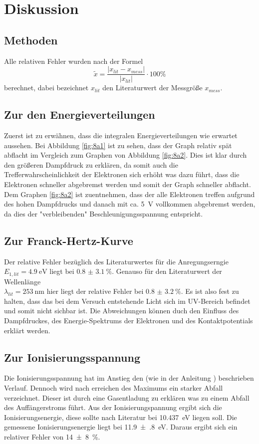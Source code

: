 \section{Diskussion}
\label{sec:Diskussion}
\subsection{Methoden}
Alle relativen Fehler wurden nach der Formel
\begin{equation*}
  \tilde{x} = \frac{ \lvert x_{lit} - x_{mess} \rvert}{\lvert x_{lit} \rvert}
  \cdot 100 \%
\end{equation*}
berechnet, dabei bezeichnet $x_{lit}$ den Literaturwert der Messgröße $x_{mess}$.
\subsection{Zur den Energieverteilungen}
Zuerst ist zu erwähnen, dass die integralen Energieverteilungen wie erwartet aussehen.
Bei Abbildung \ref{fig:8a1} ist zu sehen, dass der Graph relativ spät abflacht im
Vergleich zum Graphen von Abbildung \ref{fig:8a2}. Dies ist klar durch den
größeren Dampfdruck zu erklären, da somit auch die Trefferwahrscheinlichkeit der
Elektronen sich erhöht was dazu führt, dass die Elektronen schneller abgebremst
werden und somit der Graph schneller abflacht. Dem Graphen \ref{fig:8a2} ist
zuentnehmen, dass der alle Elektronen treffen aufgrund des hohen Dampfdrucks und
danach mit ca. \SI{5}{\volt} vollkommen abgebremst werden, da dies der "verbleibenden"
Beschleunigungsspannung entspricht.
\subsection{Zur Franck-Hertz-Kurve}
Der relative Fehler bezüglich des Literaturwertes \cite{wiki:fh} für die Anregungserngie \\
$E_{1,lit} = \SI{4.9}{\eV} $ liegt bei $ \SI{0.8(31)}{\percent} $.
Genauso für den Literaturwert \cite{wiki:fh} der Wellenlänge \\  $ \lambda_{lit} = \SI{253}{\nano \meter} $
hier liegt der relative Fehler bei $ \SI{0.8(32)}{\percent} $.
Es ist also fest zu halten, dass das bei dem Versuch entstehende Licht sich
im UV-Bereich befindet und somit nicht sichbar ist.
Die Abweichungen können duch den Einfluss des Dampfdruckes, des Energie-Spektrums der Elektronen
und des Kontaktpotentials erklärt werden.
\subsection{Zur Ionisierungsspannung}
Die Ionisierungsspannung hat im Anstieg den (wie in der Anleitung \cite{Anleitung}) beschrieben
Verlauf. Dennoch wird nach erreichen des Maximums ein starker Abfall verzeichnet.
Dieser ist durch eine Gasentladung zu erklären was zu einem Abfall des Auffängerstroms führt.
Aus der Ionisierungspannung ergibt sich die Ionisierungsenergie, diese sollte
nach Literatur \cite{PTE} bei \SI{10.437}{\eV} liegen soll. Die gemessene
Ionisierungsenergie liegt bei \SI{11.9(8)}{\eV}. Daraus ergibt sich ein relativer
Fehler von \SI{14(8)}{\percent}.
